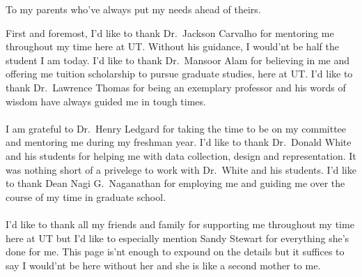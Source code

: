 \documentclass[12pt]{uthesis-v12}  %
\begin{document}
\begin{dedication}
\noindent To my parents who've always put my needs ahead of theirs.
\end{dedication}


\begin{acknowledgments}
\noindent First and foremost, I'd like to thank Dr.~Jackson Carvalho for mentoring me throughout my time here at UT. Without his guidance, I would'nt be half the student I am today. I'd like to thank Dr.~Mansoor Alam for believing in me and offering me tuition scholarship to pursue graduate studies, here at UT. I'd like to thank Dr.~Lawrence Thomas for being an exemplary professor and his words of wisdom have always guided me in tough times.\\\\I am grateful to Dr.~Henry Ledgard for taking the time to be on my committee and mentoring me during my freshman year. I'd like to thank Dr.~Donald White and his students for helping me with data collection, design and representation. It was nothing short of a privelege to work with Dr.~White and his students. I'd like to thank Dean Nagi G.~Naganathan for employing me and guiding me over the course of my time in graduate school.\\\\
I'd like to thank all my friends and family for supporting me throughout my time here at UT but I'd like to especially mention Sandy Stewart for everything she's done for me. This page is'nt enough to expound on the details but it suffices to say I would'nt be here without her and she is like a second mother to me.  
\end{acknowledgments}
\end{document}
